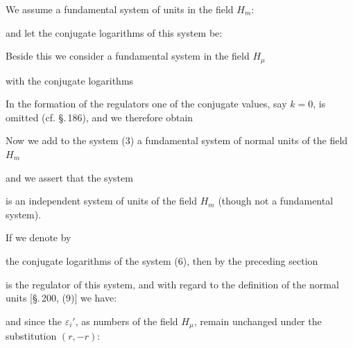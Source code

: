 
We assume a fundamental system of units in the field $H_m$:


and let the conjugate logarithms of this system be:


Beside this we consider a fundamental system in the field $H_\mu$


with the conjugate logarithms


In the formation of the regulators one of the conjugate values, say $k=0$, is omitted (cf. \S.\,186), and we therefore obtain


Now we add to the system (3) a fundamental system of normal units of the field $H_m$


and we assert that the system


is an independent system of units of the field $H_m$ (though not a fundamental system).

If we denote by


the conjugate logarithms of the system (6), then by the preceding section


is the regulator of this system, and with regard to the definition of the normal units [\S.\,200, (9)] we have:


and since the $\varepsilon_i'$, as numbers of the field $H_\mu$, remain unchanged under the substitution $(r,-r)$:

